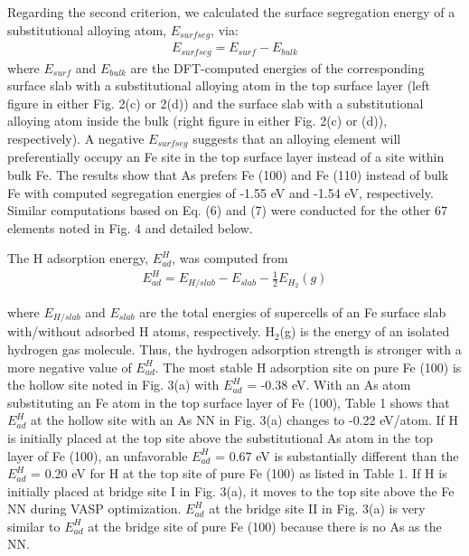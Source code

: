 Regarding the second criterion, we calculated the surface segregation energy of a substitutional alloying atom, $E_{surf seg}$, via:
\begin{align}
 E_{surf seg} = E_{surf} - E_{bulk}
 \label{Chap:Mg_H:eq:surf_seg}
\end{align}
where $E_{surf}$ and $E_{bulk}$ are the \ac{DFT}-computed energies of the corresponding surface slab with a substitutional alloying atom in the top surface layer (left figure in either Fig. 2(c) or 2(d)) and the surface slab with a substitutional alloying atom inside the bulk (right figure in either Fig. 2(c) or (d)), respectively). A negative $E_{surf seg}$ suggests that an alloying element will preferentially occupy an Fe site in the top surface layer instead of a site within bulk Fe. The results show that As prefers Fe (100) and Fe (110) instead of bulk Fe with computed segregation energies of -1.55 eV and -1.54 eV, respectively. Similar computations based on Eq. (6) and (7) were conducted for the other 67 elements noted in Fig. 4 and detailed below.

The H adsorption energy, $E_{ad}^H$, was computed from  
\begin{align}
 E_{ad}^{H} = E_{H/slab} - E_{slab} - \frac{1}{2}E_{H_2}(g)
 \label{Chap:Mg_H:eq:H_ads}
\end{align}

where $E_{H/slab}$ and $E_{slab}$ are the total energies of supercells of an Fe surface slab with/without adsorbed H atoms, respectively. $\text{H}_2$(g) is the energy of an isolated hydrogen gas molecule. Thus, the hydrogen adsorption strength is stronger with a more negative value of $E_{ad}^H$. The most stable H adsorption site on pure Fe (100) is the hollow site noted in Fig. 3(a) with $E_{ad}^H$ = -0.38 eV. With an As atom substituting an Fe atom in the top surface layer of Fe (100), Table 1 shows that $E_{ad}^H$ at the hollow site with an As \ac{NN} in Fig. 3(a) changes to -0.22 eV/atom. If H is initially placed at the top site above the substitutional As atom in the top layer of Fe (100), an unfavorable $E_{ad}^H$ = 0.67 eV is substantially different than the $E_{ad}^H$ = 0.20 eV for H at the top site of pure Fe (100) as listed in Table 1. If H is initially placed at bridge site I in Fig. 3(a), it moves to the top site above the Fe \ac{NN} during \ac{VASP} optimization. $E_{ad}^H$ at the bridge site II in Fig. 3(a) is very similar to $E_{ad}^H$ at the bridge site of pure Fe (100) because there is no As as the \ac{NN}.
